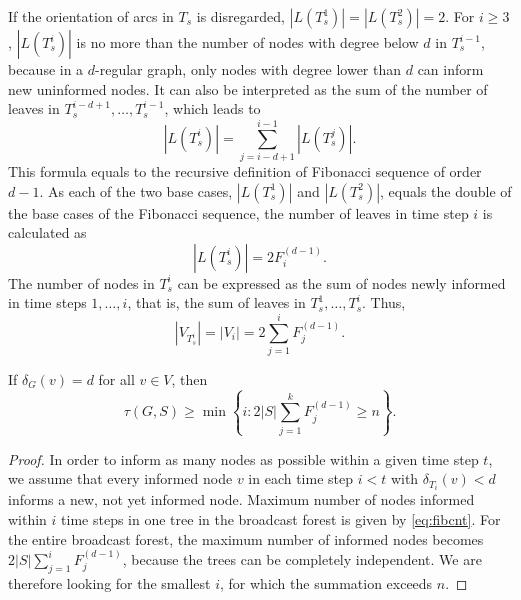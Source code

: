 If the orientation of arcs in $T_s$ is disregarded, $|L(T^1_s)|=|L(T^2_s)|=2$.
For $i\geq 3$, $|L(T^i_s)|$ is no more than the number of nodes with degree below $d$ in $T^{i-1}_s$, 
because in a $d$-regular graph, only nodes with degree lower than $d$ can inform new uninformed nodes.
It can also be interpreted as the sum of the number of leaves in $T^{i-d+1}_s,\dots,T^{i-1}_s$, which leads to %
\begin{equation*}
\label{eq:leafrec}
|L(T^i_s)|=\sum\limits_{j=i-d+1}^{i-1} |L(T^j_s)|.
\end{equation*}  
This formula equals to the recursive definition of Fibonacci sequence of order $d-1$.
As each of the two base cases, $|L(T^1_s)|$ and $|L(T^2_s)|$, equals the double of the base cases of the Fibonacci sequence, the number of leaves in time step $i$ is calculated as
\begin{equation*}
\label{eq:fibleaf}
|L(T^i_s)|=2 F^{(d-1)}_i.
\end{equation*}  
The number of nodes in $T^i_s$ can be expressed as the sum of nodes newly informed in time steps $1,\dots,i$, that is, the sum of leaves in $T^1_s,\dots,T^i_s$. Thus,
\begin{equation}
\label{eq:fibcnt}
|V_{T^i_s}|=|V_i|=2\sum\limits_{j=1}^i F^{(d-1)}_j.
\end{equation}

\begin{proposition}
	If $\delta_G(v)=d$ for all $v\in V$, then 
\begin{equation*}
\label{lem:lbreg1}
	\tau(G,S)\geq\min\left\{i:2|S|\sum\limits_{j=1}^kF^{(d-1)}_j\geq n\right\}.
\end{equation*}
\label{prop:lbfib}
\end{proposition}
\begin{proof}
In order to inform as many nodes as possible within a given time step $t$,
we assume that every informed node $v$ in each time step $i<t$ with $\delta_{T_i}(v)<d$ informs a new, not yet informed node.
Maximum number of nodes informed within $i$ time steps in one tree in the broadcast forest is given by \eqref{eq:fibcnt}.
For the entire broadcast forest, the maximum number of informed nodes becomes $2|S|\sum\limits_{j=1}^i F^{(d-1)}_j$, because the trees can be completely independent.
We are therefore looking for the smallest $i$, for which the summation exceeds $n$.
\end{proof}

